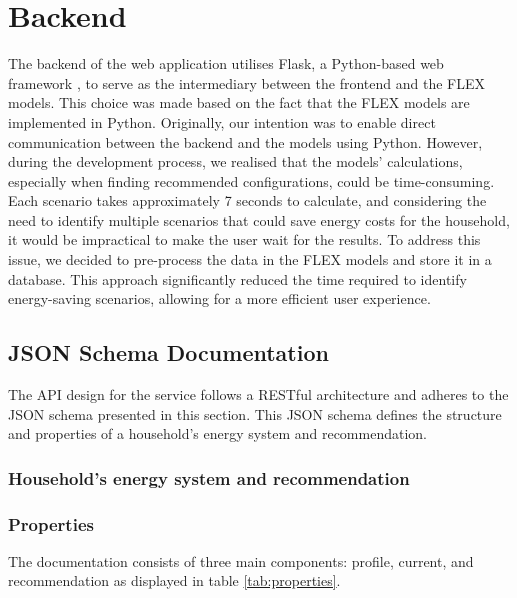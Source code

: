 \section{Backend}

The backend of the web application utilises Flask, a Python-based web framework \cite{flask}, to serve as the intermediary between the frontend and the FLEX models. 
This choice was made based on the fact that the FLEX models are implemented in Python. 
Originally, our intention was to enable direct communication between the backend and the models using Python. 
However, during the development process, we realised that the models' calculations, especially when finding recommended configurations, could be time-consuming. 
Each scenario takes approximately 7 seconds to calculate, and considering the need to identify multiple scenarios that could save energy costs for the household, 
it would be impractical to make the user wait for the results. 
To address this issue, we decided to pre-process the data in the FLEX models and store it in a database. 
This approach significantly reduced the time required to identify energy-saving scenarios, allowing for a more efficient user experience.


\subsection{JSON Schema Documentation}

The API design for the service follows a RESTful architecture and adheres to the JSON schema presented in this section. 
This JSON schema defines the structure and properties of a household's energy system and recommendation.


\subsubsection{Household's energy system and recommendation}


\subsubsection{Properties}

The documentation consists of three main components: profile, current, and recommendation as displayed in table \ref{tab:properties}. 

